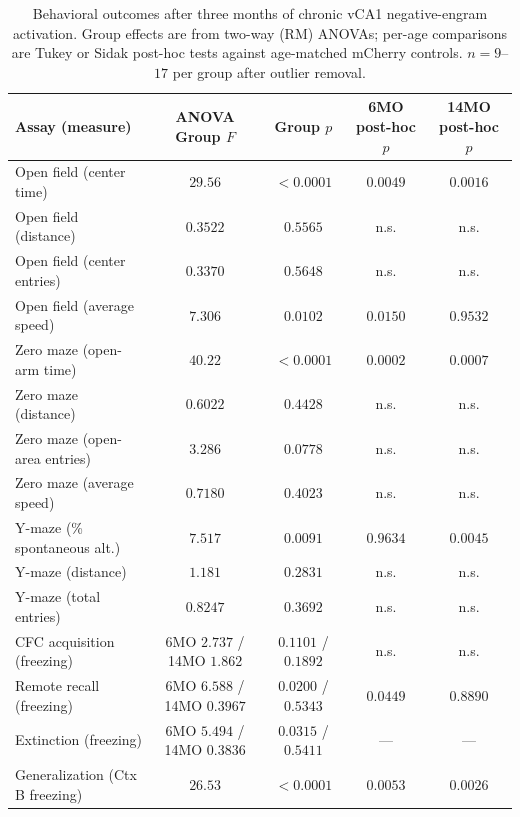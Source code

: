\documentclass[11pt]{article}
\begin{document}
\begin{table}[htbp]
\centering
\caption{Behavioral outcomes after three months of chronic vCA1 negative-engram activation. Group effects are from two-way (RM) ANOVAs; per-age comparisons are Tukey or Sidak post-hoc tests against age-matched mCherry controls. $n=9$--$17$ per group after outlier removal.}
\label{tab:behavior}
\small
\begin{tabular}{lcccc}
\toprule
Assay (measure) & ANOVA Group $F$ & Group $p$ & 6MO post-hoc $p$ & 14MO post-hoc $p$ \\
\midrule
Open field (center time)        & $29.56$  & $<0.0001$ & $0.0049$  & $0.0016$ \\
Open field (distance)           & $0.3522$ & $0.5565$  & n.s.      & n.s.     \\
Open field (center entries)     & $0.3370$ & $0.5648$  & n.s.      & n.s.     \\
Open field (average speed)      & $7.306$  & $0.0102$  & $0.0150$  & $0.9532$ \\
Zero maze (open-arm time)       & $40.22$  & $<0.0001$ & $0.0002$  & $0.0007$ \\
Zero maze (distance)            & $0.6022$ & $0.4428$  & n.s.      & n.s.     \\
Zero maze (open-area entries)   & $3.286$  & $0.0778$  & n.s.      & n.s.     \\
Zero maze (average speed)       & $0.7180$ & $0.4023$  & n.s.      & n.s.     \\
Y-maze (\% spontaneous alt.)    & $7.517$  & $0.0091$  & $0.9634$  & $0.0045$ \\
Y-maze (distance)               & $1.181$  & $0.2831$  & n.s.      & n.s.     \\
Y-maze (total entries)          & $0.8247$ & $0.3692$  & n.s.      & n.s.     \\
CFC acquisition (freezing)      & 6MO $2.737$ / 14MO $1.862$ & $0.1101$ / $0.1892$ & n.s. & n.s. \\
Remote recall (freezing)        & 6MO $6.588$ / 14MO $0.3967$ & $0.0200$ / $0.5343$ & $0.0449$ & $0.8890$ \\
Extinction (freezing)           & 6MO $5.494$ / 14MO $0.3836$ & $0.0315$ / $0.5411$ & --- & --- \\
Generalization (Ctx B freezing) & $26.53$  & $<0.0001$ & $0.0053$  & $0.0026$ \\
\bottomrule
\end{tabular}
\end{table}
\end{document}

